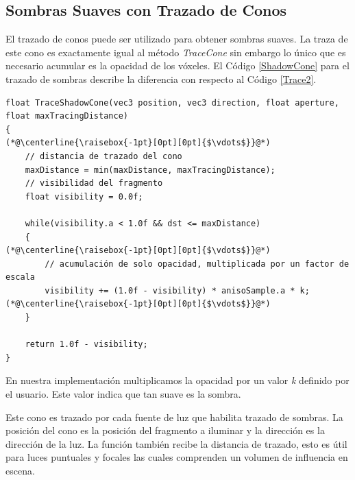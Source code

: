 \subsection{Sombras Suaves con Trazado de Conos} %
\label{sub:sombras_con_trazado_de_conos}
El trazado de conos puede ser utilizado para obtener sombras suaves. La traza de este cono es exactamente igual al método \emph{TraceCone} sin embargo lo único que es necesario acumular es la opacidad de los vóxeles. El Código \ref{ShadowCone} para el trazado de sombras describe la diferencia con respecto al Código \ref{Trace2}.
\\
\begin{lstlisting}[caption={Trazado de sombras con conos.}, label=ShadowCone]
float TraceShadowCone(vec3 position, vec3 direction, float aperture, float maxTracingDistance)
{
(*@\centerline{\raisebox{-1pt}[0pt][0pt]{$\vdots$}}@*)
    // distancia de trazado del cono
    maxDistance = min(maxDistance, maxTracingDistance);
    // visibilidad del fragmento
    float visibility = 0.0f;
    
    while(visibility.a < 1.0f && dst <= maxDistance)
    {
(*@\centerline{\raisebox{-1pt}[0pt][0pt]{$\vdots$}}@*)
        // acumulación de solo opacidad, multiplicada por un factor de escala
        visibility += (1.0f - visibility) * anisoSample.a * k;
(*@\centerline{\raisebox{-1pt}[0pt][0pt]{$\vdots$}}@*)
    }

    return 1.0f - visibility;
}
\end{lstlisting}

En nuestra implementación multiplicamos la opacidad por un valor \emph{k} definido por el usuario. Este valor indica que tan suave es la sombra.

Este cono es trazado por cada fuente de luz que habilita trazado de sombras. La posición del cono es la posición del fragmento a iluminar y la dirección es la dirección de la luz. La función también recibe la distancia de trazado, esto es útil para luces puntuales y focales las cuales comprenden un volumen de influencia en escena.

